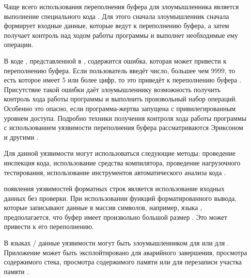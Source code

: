 %
Чаще всего  использования переполнения буфера для злоумышленника является выполнение специального кода . 
%
Для этого сначала злоумышленник сначала формирует входные данные, которые ведут к переполнению буфера, а затем получает контроль над ходом работы программы и выполнет необходимые ему операции. 

%
В коде , представленной в , содержится ошибка, которая может привести к переполнению буфера.
%
Если пользователь введёт число, большее чем 9999, то есть которое имеет 5 или более цифр, то это приведёт к переполнению буфера .
%
Присутствие такой ошибки даёт злоумышленнику возможность получить контроль хода работы программы и выполнить произвольный набор операций.
%
Особенно это опасно, если программа-жертва запущена с привилегированным уровнем доступа.
%
Подробно техники получения контроля хода работы программы с использованием уязвимости переполнения буфера рассматриваются Эриксоном и другими  .

%
%
Для  данной уязвимости могут использоваться следующие методы: проведение инспекция кода, использование средства компилятора, проведение нагрузочного тестирования, использование инструментов автоматического анализа кода   .



%
 появления уязвимостей форматных строк является использование входных данных без проверки. 
%
При использовании функций форматированного вывода, которые записывают данные в массив символов, например,  языка , предполагается, что буфер имеет произвольно большой размер . 
%
Это может привести к его переполнению.

%
В языках / данные уязвимости могут быть  злоумышленником для  или для  . 
%
Приложение может быть эксплойтировано для аварийного завершения, просмотра содержимого стека, просмотра содержимого памяти или для перезаписи участка памяти   . 

